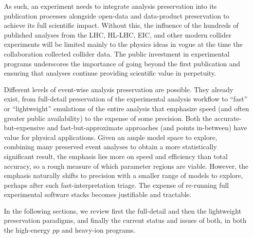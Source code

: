 \documentclass[11pt]{article}
\begin{document}
As such, an experiment needs to integrate analysis preservation into its publication processes alongside open-data and data-product preservation to achieve its full scientific impact. Without this, the influence of the hundreds of published analyses from the LHC, HL-LHC, EIC, and other modern collider experiments will be limited mainly to the physics ideas in vogue at the time the collaboration collected collider data. The public investment in experimental programs underscores the importance of going beyond the first publication and ensuring that analyses continue providing scientific value in perpetuity.

Different levels of event-wise analysis preservation are possible. They already exist, from full-detail preservation of the experimental analysis workflow to ``fast'' or ``lightweight'' emulations of the entire analysis that emphasize speed (and often greater public availability) to the expense of some precision. Both the accurate-but-expensive and fast-but-approximate approaches (and points in-between) have value for physical applications. Given an ample model space to explore, combining many preserved event analyses to obtain a more statistically significant result, the emphasis lies more on speed and efficiency than total accuracy, so a rough measure of which parameter regions are viable. However, the emphasis naturally shifts to precision with a smaller range of models to explore, perhaps after such fast-interpretation triage. The expense of re-running full experimental software stacks becomes justifiable and tractable.

In the following sections, we review first the full-detail and then the lightweight preservation paradigms, and finally the current status and issues of both, in both the high-energy $pp$ and heavy-ion programs.


\end{document}
